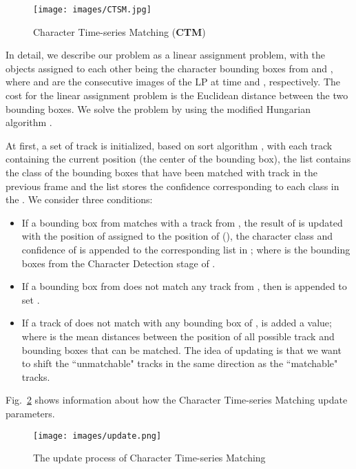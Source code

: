 \documentclass[conference]{IEEEtran}
\begin{document}
\begin{figure}[htp]
  \centering
    \texttt{[image: images/CTSM.jpg]}
  \caption{Character Time-series Matching (\textbf{CTM})}
  \label{ctsm}
\end{figure}
In detail, we describe our problem as a linear assignment problem, with the objects assigned to each other being the character bounding boxes from  and , where  and  are the consecutive images of the LP  at time  and , respectively. The cost for the linear assignment problem is the Euclidean distance between the two bounding boxes. We solve the problem by using the modified Hungarian algorithm \cite{hungarian}. 

At first, a set of track is initialized,  based on sort algorithm \cite{sort}, with each track  containing the current position (the center of the bounding box), the list  contains the class of the bounding boxes that have been matched with track  in the previous frame and the list  stores the confidence corresponding to each class in the .
We consider three conditions:


\begin{itemize}[]
    \item If a bounding box  from  matches with a track  from , the result of  is updated with the position of  assigned to the position of  (), the character class and confidence of  is appended to the corresponding list in  ;  where  is the bounding boxes from the Character Detection stage of .
    
    \item If a bounding box  from  does not match any track from , then   is appended to set . 

    \item If a track  of  does not match with any bounding box of ,  is added a  value; where  is the mean distances between the position of all possible track and bounding boxes that can be matched. The idea of updating  is that we want to shift the ``unmatchable" tracks in the same direction as the ``matchable" tracks.
   
\end{itemize}
Fig.~\ref{updatebox} shows information about how the Character Time-series Matching update parameters. 
\begin{figure}[htp]
  \centering
    \texttt{[image: images/update.png]}
  \caption{The update process of Character Time-series Matching}
  \label{updatebox}
\end{figure}
\end{document}
